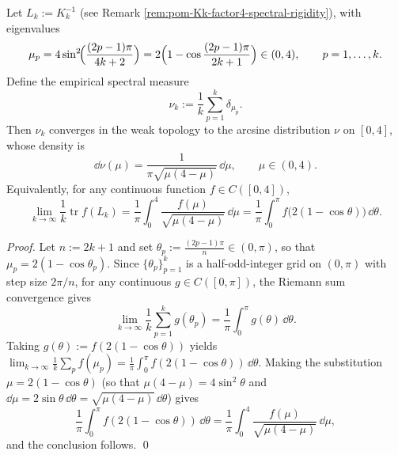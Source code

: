 \begin{theorem}\label{thm:pom-Lk-arcsine-law}
Let \(L_k:=K_k^{-1}\) (see Remark \ref{rem:pom-Kk-factor4-spectral-rigidity}), with eigenvalues
\[
\mu_p
=4\sin^2\!\Bigl(\frac{(2p-1)\pi}{4k+2}\Bigr)
=2\Bigl(1-\cos\frac{(2p-1)\pi}{2k+1}\Bigr)\in(0,4),
\qquad p=1,\dots,k.
\]
Define the empirical spectral measure
\[
\nu_k:=\frac{1}{k}\sum_{p=1}^{k}\delta_{\mu_p}.
\]
Then \(\nu_k\) converges in the weak topology to the arcsine distribution \(\nu\) on \([0,4]\), whose density is
\[
\dd\nu(\mu)=\frac{1}{\pi\sqrt{\mu(4-\mu)}}\,\dd\mu,\qquad \mu\in(0,4).
\]
Equivalently, for any continuous function \(f\in C([0,4])\),
\[
\lim_{k\to\infty}\frac{1}{k}\operatorname{tr}f(L_k)
=\frac{1}{\pi}\int_{0}^{4}\frac{f(\mu)}{\sqrt{\mu(4-\mu)}}\,\dd\mu
=\frac{1}{\pi}\int_{0}^{\pi} f\!\bigl(2(1-\cos\theta)\bigr)\,\dd\theta.
\]
\end{theorem}
\begin{proof}
Let \(n:=2k+1\) and set \(\theta_p:=\frac{(2p-1)\pi}{n}\in(0,\pi)\), so that \(\mu_p=2(1-\cos\theta_p)\).
Since \(\{\theta_p\}_{p=1}^k\) is a half-odd-integer grid on \((0,\pi)\) with step size \(2\pi/n\),
for any continuous \(g\in C([0,\pi])\), the Riemann sum convergence gives
\[
\lim_{k\to\infty}\frac{1}{k}\sum_{p=1}^{k} g(\theta_p)
=\frac{1}{\pi}\int_0^\pi g(\theta)\,\dd\theta.
\]
Taking \(g(\theta):=f(2(1-\cos\theta))\) yields
\(
\lim_{k\to\infty}\frac{1}{k}\sum_{p} f(\mu_p)=\frac{1}{\pi}\int_0^\pi f(2(1-\cos\theta))\,\dd\theta
\).
Making the substitution \(\mu=2(1-\cos\theta)\) (so that \(\mu(4-\mu)=4\sin^2\theta\) and \(\dd\mu=2\sin\theta\,\dd\theta=\sqrt{\mu(4-\mu)}\,\dd\theta\)) gives
\[
\frac{1}{\pi}\int_0^\pi f(2(1-\cos\theta))\,\dd\theta
=\frac{1}{\pi}\int_0^4 \frac{f(\mu)}{\sqrt{\mu(4-\mu)}}\,\dd\mu,
\]
and the conclusion follows. \qed
\end{proof}


